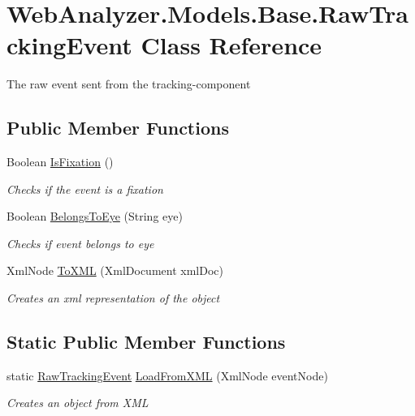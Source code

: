 \hypertarget{class_web_analyzer_1_1_models_1_1_base_1_1_raw_tracking_event}{}\section{Web\+Analyzer.\+Models.\+Base.\+Raw\+Tracking\+Event Class Reference}
\label{class_web_analyzer_1_1_models_1_1_base_1_1_raw_tracking_event}


The raw event sent from the tracking-\/component  


\subsection*{Public Member Functions}
\begin{DoxyCompactItemize}
\item 
Boolean \hyperlink{class_web_analyzer_1_1_models_1_1_base_1_1_raw_tracking_event_a061ad649c7d39dba8fa0f8919a13ca49}{Is\+Fixation} ()
\begin{DoxyCompactList}\small\item\em Checks if the event is a fixation \end{DoxyCompactList}\item 
Boolean \hyperlink{class_web_analyzer_1_1_models_1_1_base_1_1_raw_tracking_event_a4a77576729765b02ffe84d60cdff6363}{Belongs\+To\+Eye} (String eye)
\begin{DoxyCompactList}\small\item\em Checks if event belongs to eye \end{DoxyCompactList}\item 
Xml\+Node \hyperlink{class_web_analyzer_1_1_models_1_1_base_1_1_raw_tracking_event_ac1deb430c3bf16edc018c66ec2d9f9e2}{To\+X\+M\+L} (Xml\+Document xml\+Doc)
\begin{DoxyCompactList}\small\item\em Creates an xml representation of the object \end{DoxyCompactList}\end{DoxyCompactItemize}
\subsection*{Static Public Member Functions}
\begin{DoxyCompactItemize}
\item 
static \hyperlink{class_web_analyzer_1_1_models_1_1_base_1_1_raw_tracking_event}{Raw\+Tracking\+Event} \hyperlink{class_web_analyzer_1_1_models_1_1_base_1_1_raw_tracking_event_aafceb7a390ce8b6b09d5f46970ae6f91}{Load\+From\+X\+M\+L} (Xml\+Node event\+Node)
\begin{DoxyCompactList}\small\item\em Creates an object from X\+M\+L \end{DoxyCompactList}\end{DoxyCompactItemize}
